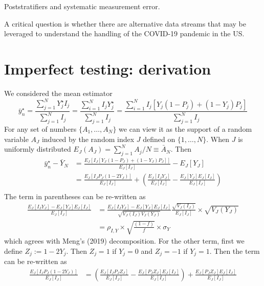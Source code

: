 \documentclass[11pt]{amsart}
\begin{document}
Poststratifiers and systematic measurement error.

A critical question is whether there are alternative data streams that may be leveraged to understand the handling of the COVID-19 pandemic in the US.

\appendix

\section{Imperfect testing: derivation}

We considered the mean estimator
$$
\bar y_n^\star = \frac{\sum_{j=1}^N Y_j^\star I_j}{\sum_{j=1}^N I_j} = \frac{\sum_{i=1}^N  I_j Y_j^\star }{\sum_{j=1}^N  I_j } = \frac{\sum_{i=1}^N  I_j \left[ Y_j (1-P_j) + (1-Y_j) P_j \right]}{\sum_{j=1}^N  I_j }
$$
For any set of numbers $\{ A_1, \ldots, A_N \}$ we can view it as the support of a random variable $A_J$ induced by the random index $J$ defined on $\{1,\ldots, N\}$.  When $J$ is uniformly distributed $E_J (A_J) = \sum_{j=1}^N A_j / N \equiv \bar A_N$. Then
$$
\begin{aligned}
\bar y_n^\star  - \bar Y_N &= \frac{E_J \left[ I_J \left[ Y_J (1-P_J) + (1-Y_J) P_J \right] \right]}{E_J [ I_J ] } - E_J[Y_J] \\
&= \frac{E_J \left[ I_J P_J (1-2Y_J) \right]}{E_J [ I_J ] } + \left( \frac{E_J [I_J Y_J]}{E_J [ I_J ] } - \frac{E_J[Y_J] E_J[I_J]}{E_J[I_J]} \right) \\
\end{aligned}
$$
The term in parentheses can be re-written as
$$
\begin{aligned}
\frac{E_J [I_J Y_J]- E_J[Y_J] E_J[I_J]}{E_J[I_J]} &=  \frac{E_J [I_J Y_J]- E_J[Y_J] E_J[I_J]}{\sqrt{V_J(I_J) V_J(Y_J)}} \frac{\sqrt{V_J(I_J)}}{E_J[I_J]} \times \sqrt{V_J(Y_J)} \\
&= \rho_{I,Y} \times \sqrt{\frac{(1-f)}{f}} \times \sigma_Y
\end{aligned}
$$
which agrees with Meng's (2019) decomposition. For the other term, first we define $Z_j := 1 - 2 Y_j $. Then $Z_j = 1$ if $Y_j = 0$ and $Z_j = -1$ if $Y_j = 1$. Then the term can be re-written as
$$
\begin{aligned}
\frac{E_J \left[ I_J P_J (1-2Y_J) \right]}{E_J [ I_J ] } &= \left( \frac{E_J \left[ I_J P_J Z_J \right]}{E_J [ I_J ] } -  \frac{E_J \left[ P_J Z_J \right] E_J[ I_J]}{E_J [ I_J ] } \right) +  \frac{E_J \left[ P_J Z_J \right] E_J[ I_J]}{E_J [ I_J ] } \\
\end{aligned}
$$
\end{document}

